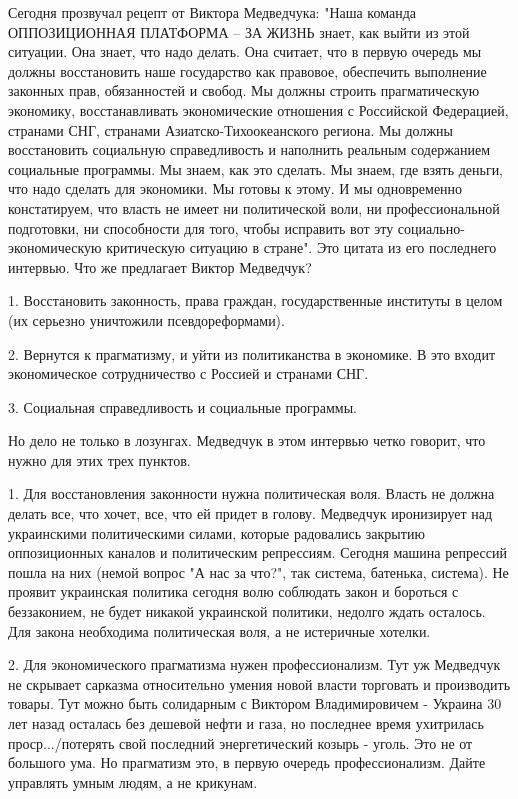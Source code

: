 Сегодня прозвучал рецепт от Виктора Медведчука:  "Наша команда ОППОЗИЦИОННАЯ
ПЛАТФОРМА – ЗА ЖИЗНЬ знает, как выйти из этой ситуации. Она знает, что надо
делать. Она считает, что в первую очередь мы должны восстановить наше
государство как правовое, обеспечить выполнение законных прав, обязанностей и
свобод. Мы должны строить прагматическую экономику, восстанавливать
экономические отношения с Российской Федерацией, странами СНГ, странами
Азиатско-Тихоокеанского региона. Мы должны восстановить социальную
справедливость и наполнить реальным содержанием социальные программы. Мы знаем,
как это сделать. Мы знаем, где взять деньги, что надо сделать для экономики. Мы
готовы к этому. И мы одновременно констатируем, что власть не имеет ни
политической воли, ни профессиональной подготовки, ни способности для того,
чтобы исправить вот эту социально-экономическую критическую ситуацию в стране".
Это цитата из его последнего интервью. Что же предлагает Виктор Медведчук?

1. Восстановить законность, права граждан, государственные институты в целом
(их серьезно уничтожили псевдореформами). 

2. Вернутся к прагматизму, и уйти из политиканства в экономике. В это входит
экономическое сотрудничество с Россией и странами СНГ. 

3. Социальная справедливость и социальные программы. 

Но дело не только в лозунгах. Медведчук в этом интервью четко говорит, что
нужно для этих трех пунктов.  

1. Для восстановления законности нужна политическая воля. Власть не должна
делать все, что хочет, все, что ей придет в голову. Медведчук иронизирует над
украинскими политическими силами, которые радовались закрытию оппозиционных
каналов и политическим репрессиям. Сегодня машина репрессий пошла на них (немой
вопрос "А нас за что?", так система, батенька, система). Не проявит украинская
политика сегодня волю соблюдать закон и бороться с беззаконием, не будет
никакой украинской политики, недолго ждать осталось. Для закона необходима
политическая воля, а не истеричные хотелки. 

2. Для экономического прагматизма нужен профессионализм. Тут уж Медведчук не
скрывает сарказма относительно умения новой власти торговать и производить
товары. Тут можно быть солидарным с Виктором Владимировичем - Украина 30 лет
назад осталась без дешевой нефти и газа, но последнее время ухитрилась
проср.../потерять свой последний энергетический козырь - уголь.  Это не от
большого ума. Но прагматизм это, в первую очередь профессионализм. Дайте
управлять умным людям, а не крикунам. 

